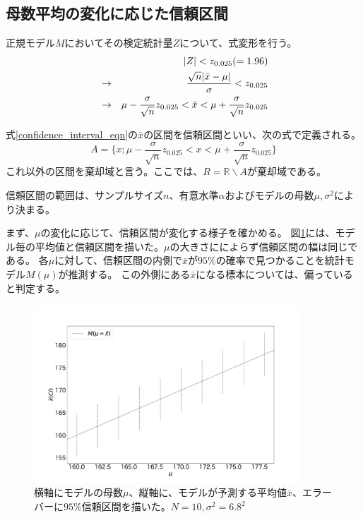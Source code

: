 \subsection{母数平均の変化に応じた信頼区間}
正規モデル$M$においてその検定統計量$Z$について、式変形を行う。
\begin{eqnarray}
    & &|Z| < z_{0.025}( = 1.96 ) \notag \\
    &\rightarrow& \frac{\sqrt{n}|\bar{x}-\mu|}{\sigma} < z_{0.025} \notag\\
    &\rightarrow& \mu-\frac{\sigma}{\sqrt{n}}z_{0.025} < \bar{x} < \mu+\frac{\sigma}{\sqrt{n}}z_{0.025} \label{confidence_interval_eqn}
\end{eqnarray}

\begin{defi}
式\eqref{confidence_interval_eqn}の$\bar{x}$の区間を信頼区間といい、次の式で定義される。
\begin{equation*}
    A=\{x;\mu-\frac{\sigma}{\sqrt{n}}z_{0.025} < x < \mu+\frac{\sigma}{\sqrt{n}}z_{0.025} \}
\end{equation*}
これ以外の区間を棄却域と言う。ここでは、$R=\mathbb{R}\backslash A$が棄却域である。
\end{defi}
信頼区間の範囲は、サンプルサイズ$n$、有意水準$\alpha$およびモデルの母数$\mu,\sigma^2$により決まる。

まず、$\mu$の変化に応じて、信頼区間が変化する様子を確かめる。
図\ref{fig:confidence_interval_model}には、モデル毎の平均値と信頼区間を描いた。$\mu$の大きさにによらず信頼区間の幅は同じである。
各$\mu$に対して、信頼区間の内側で$\bar{x}$が$95\%$の確率で見つかることを統計モデル$M(\mu)$が推測する。
この外側にある$\bar{x}$になる標本については、偏っていると判定する。

\begin{figure}
    \begin{center}
        \includegraphics[width=10cm]{./image/04_/confidence_interval_model.pdf}
        \caption{横軸にモデルの母数$\mu$、縦軸に、モデルが予測する平均値$\bar{x}$、エラーバーに$95\%$信頼区間を描いた。$N=10,\sigma^2=6.8^2$}
        \label{fig:confidence_interval_model}

    \end{center}
\end{figure}



